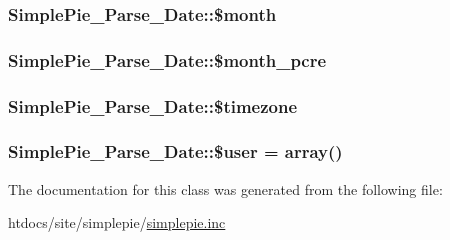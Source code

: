 \hypertarget{class_simple_pie___parse___date_a6399077cd9df43efc4d235c1f2cb538d}{
\subsubsection[{\$month}]{\setlength{\rightskip}{0pt plus 5cm}Simple\-Pie\-\_\-\-Parse\-\_\-\-Date\-::\$month}}\label{class_simple_pie___parse___date_a6399077cd9df43efc4d235c1f2cb538d}
\hypertarget{class_simple_pie___parse___date_a693fb5ee721728d4a66e8f0abc316e98}{
\subsubsection[{\$month\-\_\-pcre}]{\setlength{\rightskip}{0pt plus 5cm}Simple\-Pie\-\_\-\-Parse\-\_\-\-Date\-::\$month\-\_\-pcre}}\label{class_simple_pie___parse___date_a693fb5ee721728d4a66e8f0abc316e98}
\hypertarget{class_simple_pie___parse___date_a940617fb20faaf072f48c40f0c613234}{
\subsubsection[{\$timezone}]{\setlength{\rightskip}{0pt plus 5cm}Simple\-Pie\-\_\-\-Parse\-\_\-\-Date\-::\$timezone}}\label{class_simple_pie___parse___date_a940617fb20faaf072f48c40f0c613234}
\hypertarget{class_simple_pie___parse___date_aa4720251ef9ce6d1ec79437512a1791c}{
\subsubsection[{\$user}]{\setlength{\rightskip}{0pt plus 5cm}Simple\-Pie\-\_\-\-Parse\-\_\-\-Date\-::\$user = array()}}\label{class_simple_pie___parse___date_aa4720251ef9ce6d1ec79437512a1791c}


The documentation for this class was generated from the following file\-:\begin{DoxyCompactItemize}
\item 
htdocs/site/simplepie/\hyperlink{simplepie_8inc}{simplepie.\-inc}\end{DoxyCompactItemize}
